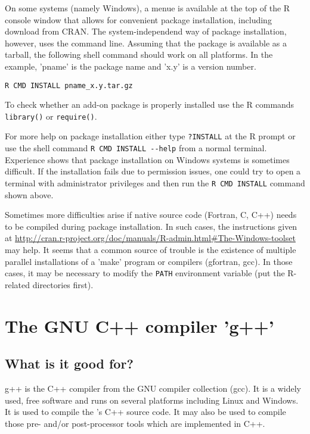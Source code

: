 On some systems (namely Windows), a menue is available at the top of the R console window that allows for convenient package installation, including download from CRAN. The system-independend way of package installation, however, uses the command line. Assuming that the package is available as a tarball, the following shell command should work on all platforms. In the example, 'pname' is the package name and 'x.y' is a version number.

\begin{lstlisting}[style=shell]
R CMD INSTALL pname_x.y.tar.gz
\end{lstlisting}

To check whether an add-on package is properly installed use the R commands \verb!library()! or \verb!require()!.

For more help on package installation either type \verb!?INSTALL! at the R prompt or use the shell command \verb!R CMD INSTALL --help! from a normal terminal. Experience shows that package installation on Windows systems is sometimes difficult. If the installation fails due to permission issues, one could try to open a terminal with administrator privileges and then run the \verb!R CMD INSTALL! command shown above.

Sometimes more difficulties arise if native source code (Fortran, C, C++) needs to be compiled during package installation. In such cases, the instructions given at \url{http://cran.r-project.org/doc/manuals/R-admin.html#The-Windows-toolset} may help. It seems that a common source of trouble is the existence of multiple parallel installations of a 'make' program or compilers (gfortran, gcc). In those cases, it may be necessary to modify the \verb!PATH! environment variable (put the R-related directories first).


\section{The GNU C++ compiler 'g++'} \label{sec:extSoft:gpp}

\subsection{What is it good for?} \label{sec:extSoft:gpp:why}
g++ is the C++ compiler from the GNU compiler collection (gcc). It is a widely used, free software and runs on several platforms including Linux and Windows. It is used to compile the 's C++ source code. It may also be used to compile those pre- and/or post-processor tools which are implemented in C++.

